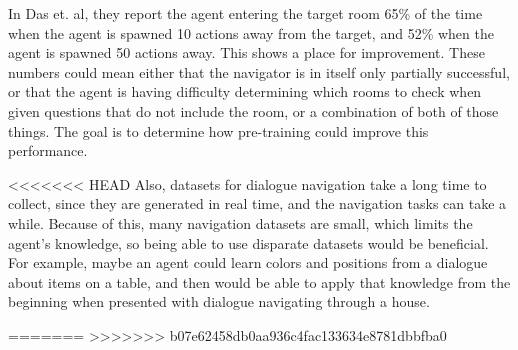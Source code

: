 \documentclass{article}
\begin{document}
In Das et. al, they report the agent entering the target room 65\% of the time when the agent is spawned 10 actions away from the target, and 52\% when the agent is spawned 50 actions away\cite{embodiedqa}. This shows a place for improvement. These numbers could mean either that the navigator is in itself only partially successful, or that the agent is having difficulty determining which rooms to check when given questions that do not include the room, or a combination of both of those things. The goal is to determine how pre-training could improve this performance. 

<<<<<<< HEAD
Also, datasets for dialogue navigation take a long time to collect, since they are
generated in real time, and the navigation tasks can take a while. %
Because of this, many navigation datasets are small, which limits the agent's knowledge, so being able to use disparate datasets would be beneficial. For example, maybe an agent could learn colors and positions from a dialogue about items on a table, and then would be able to apply that knowledge from the beginning when presented with dialogue navigating through a house.

=======
>>>>>>> b07e62458db0aa936c4fac133634e8781dbbfba0
\end{document}
